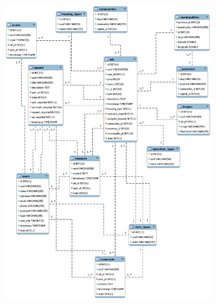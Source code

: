 \begin{figure}[h]
\centering
\includegraphics[width=1\textwidth]{Img/Disenyo/MR_workbench.png}
\end{figure}

